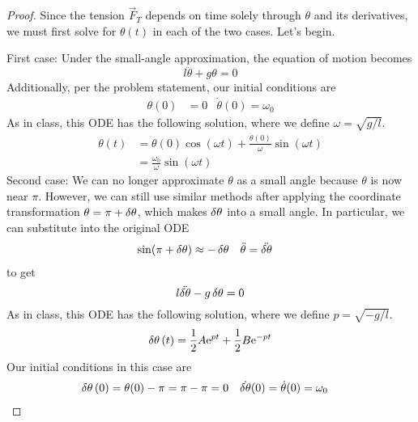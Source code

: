 \documentclass[../psets.tex]{subfiles}
\begin{document}
\begin{enumerate}
\begin{enumerate}
        \begin{proof}
            Since the tension $\vec{F}_T$ depends on time solely through $\theta$ and its derivatives, we must first solve for $\theta(t)$ in each of the two cases. Let's begin.\par
            First case: Under the small-angle approximation, the equation of motion becomes
            \begin{equation*}
                l\ddot{\theta}+g\theta = 0
            \end{equation*}
            Additionally, per the problem statement, our initial conditions are
            \begin{align*}
                \theta(0) &= 0&
                \dot{\theta}(0) = \omega_0
            \end{align*}
            As in class, this ODE has the following solution, where we define $\omega=\sqrt{g/l}$.
            \begin{align*}
                \theta(t) &= \theta(0)\cos(\omega t)+\frac{\dot{\theta}(0)}{\omega}\sin(\omega t)\\
                &= \frac{\omega_0}{\omega}\sin(\omega t)
            \end{align*}
            Second case: We can no longer approximate $\theta$ as a small angle because $\theta$ is now near $\pi$. However, we can still use similar methods after applying the coordinate transformation $\theta=\pi+\var{\theta}$, which makes $\var{\theta}$ into a small angle. In particular, we can substitute into the original ODE
            \begin{align*}
                \sin(\pi+\var{\theta}) &\approx -\var{\theta}&
                \ddot{\theta} &= \ddot{\var{\theta}}
            \end{align*}
            to get
            \begin{equation*}
                l\ddot{\var{\theta}}-g\var{\theta} = 0
            \end{equation*}
            As in class, this ODE has the following solution, where we define $p=\sqrt{-g/l}$.
            \begin{equation*}
                \var{\theta}(t) = \frac{1}{2}A\e[pt]+\frac{1}{2}B\e[-pt]
            \end{equation*}
            Our initial conditions in this case are
            \begin{align*}
                \var{\theta}(0) &= \theta(0)-\pi = \pi-\pi = 0&
                \dot{\var{\theta}}(0) &= \dot{\theta}(0) = \omega_0

\end{align*}
\end{proof}
\end{enumerate}
\end{enumerate}
\end{document}
